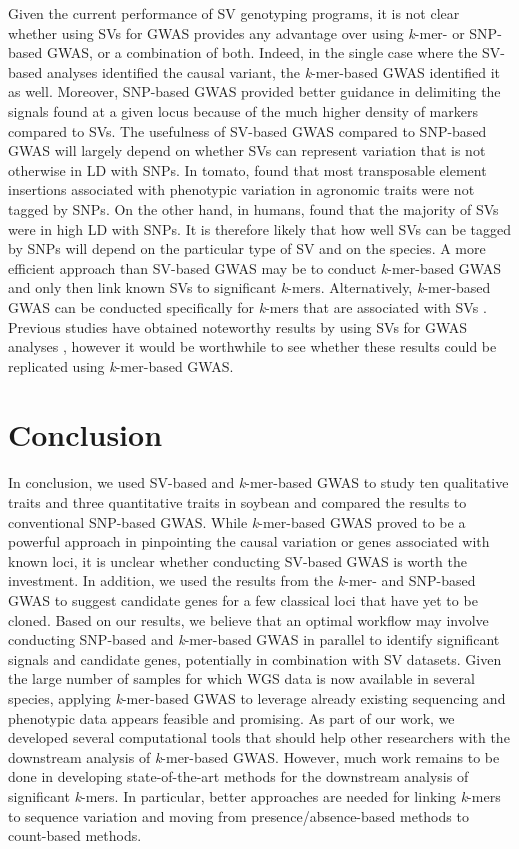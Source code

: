 Given the current performance of SV genotyping programs, it is not clear
whether using SVs for GWAS provides any advantage over using \emph{k}-mer- or
SNP-based GWAS, or a combination of both.  Indeed, in the single case where the
SV-based analyses identified the causal variant, the \emph{k}-mer-based GWAS
identified it as well. Moreover, SNP-based GWAS provided better guidance
in delimiting the signals found at a given locus because of the much higher
density of markers compared to SVs.  The usefulness of SV-based GWAS compared
to SNP-based GWAS will largely depend on whether SVs can represent variation
that is not otherwise in LD with SNPs. In tomato, \cite{dominguez2020} found
that most transposable element insertions associated with phenotypic variation
in agronomic traits were not tagged by SNPs. On the other hand, in humans,
\cite{maretty2017} found that the majority of SVs were in high LD with SNPs. It
is therefore likely that how well SVs can be tagged by SNPs will depend on the
particular type of SV and on the species. A more efficient approach than
SV-based GWAS may be to conduct \emph{k}-mer-based GWAS and only then link
known SVs to significant \emph{k}-mers.  Alternatively, \textit{k}-mer-based
GWAS can be conducted specifically for \textit{k}-mers that are associated with
SVs \citep{jayakodi2020}.  Previous studies have obtained noteworthy results by
using SVs for GWAS analyses \citep[e.g.][]{zhang2015, akakpo2020,
dominguez2020}, however it would be worthwhile to see whether these results
could be replicated using \emph{k}-mer-based GWAS.

\section*{Conclusion}

In conclusion, we used SV-based and \emph{k}-mer-based GWAS to study ten
qualitative traits and three quantitative traits in soybean and
compared the results to conventional SNP-based GWAS. While \emph{k}-mer-based
GWAS proved to be a powerful approach in pinpointing the causal variation or
genes associated with known loci, it is unclear whether conducting SV-based
GWAS is worth the investment. In addition, we used the results from the
\emph{k}-mer- and SNP-based GWAS to suggest candidate genes for a few classical
loci that have yet to be cloned. Based on our results, we believe that an
optimal workflow may involve conducting SNP-based and \emph{k}-mer-based GWAS
in parallel to identify significant signals and candidate genes, potentially in
combination with SV datasets. Given the large number of samples for which WGS
data is now available in several species, applying \emph{k}-mer-based GWAS to
leverage already existing sequencing and phenotypic data appears feasible and
promising.  As part of our work, we developed several computational tools that
should help other researchers with the downstream analysis of
\emph{k}-mer-based GWAS. However, much work remains to be done in
developing state-of-the-art methods for the downstream analysis of significant
\emph{k}-mers. In particular, better approaches are needed for linking
\emph{k}-mers to sequence variation and moving from presence/absence-based
methods to count-based methods.

